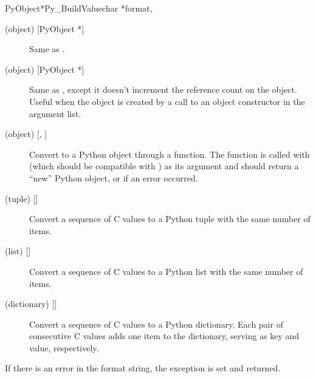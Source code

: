 \begin{cfuncdesc}{PyObject*}{Py_BuildValue}{char *format,
                                            \moreargs}
\begin{description}
    \item[ (object) {[PyObject *]}]
    Same as .

    \item[ (object) {[PyObject *]}]
    Same as , except it doesn't increment the reference count
    on the object.  Useful when the object is created by a call to an
    object constructor in the argument list.

    \item[ (object) {[, ]}]
    Convert  to a Python object through a
     function.  The function is called with
     (which should be compatible with ) as
    its argument and should return a ``new'' Python object, or \NULL{}
    if an error occurred.

    \item[ (tuple) {[]}]
    Convert a sequence of C values to a Python tuple with the same
    number of items.

    \item[ (list) {[]}]
    Convert a sequence of C values to a Python list with the same
    number of items.

    \item[ (dictionary) {[]}]
    Convert a sequence of C values to a Python dictionary.  Each pair
    of consecutive C values adds one item to the dictionary, serving
    as key and value, respectively.

  \end{description}

  If there is an error in the format string, the
   exception is set and \NULL{} returned.
\end{cfuncdesc}
